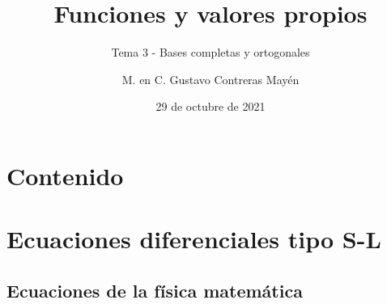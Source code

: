 \documentclass[12pt]{beamer}
\date{29 de octubre de 2021}
\title{\large{Funciones y valores propios}}
\subtitle{Tema 3 - Bases completas y ortogonales}
\author{M. en C. Gustavo Contreras Mayén}
\begin{document}
\maketitle
\fontsize{14}{14}\selectfont
{}

\section*{Contenido}

\section{Ecuaciones diferenciales tipo S-L}
\subsection{Ecuaciones de la física matemática}
\end{document}
